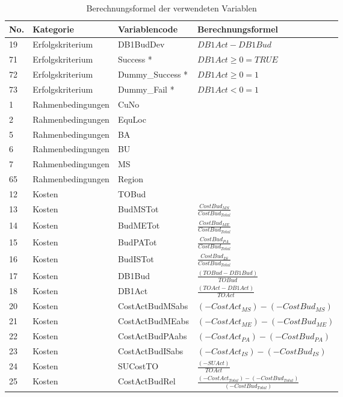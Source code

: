 \begin{longtable}{p{0.5cm}|p{4cm}|p{3.5cm}|p{6cm}}
	\caption{Berechnungsformel der verwendeten Variablen}\\
	\textbf{No.} & \textbf{Kategorie} & {\textbf{Variablencode}} & {\textbf{Berechnungsformel}} \\\hline\endhead
	19    & Erfolgskriterium & DB1BudDev & $DB1Act - DB1Bud$ \\
	71    & Erfolgskriterium & Success *& $DB1Act \geq 0 = TRUE$ \\
	72    & Erfolgskriterium & Dummy\_Success *& $DB1Act \geq 0 = 1$\\
	73    & Erfolgskriterium & Dummy\_Fail *& $DB1Act < 0 = 1$\\\hline
	1     & Rahmenbedingungen & CuNo & \\
	2     & Rahmenbedingungen & EquLoc & \\
	5     & Rahmenbedingungen & BA & \\
	6     & Rahmenbedingungen & BU & \\
	7     & Rahmenbedingungen & MS  &\\
	65    & Rahmenbedingungen & Region & \\\hline
	12    & Kosten & TOBud &\\
	13    & Kosten & BudMSTot & $\frac{Cost Bud_{MS}}{Cost Bud_{Total}}$\\ [3mm]
	14    & Kosten & BudMETot & $\frac{Cost Bud_{ME}}{Cost Bud_{Total}}$ \\[3mm] 
	15    & Kosten & BudPATot & $\frac{Cost Bud_{PA}}{Cost Bud_{Total}}$\\ [3mm]
	16    & Kosten & BudISTot & $\frac{Cost Bud_{IS}}{Cost Bud_{Total}}$\\ [3mm]
	17    & Kosten & DB1Bud & $\frac{(TOBud - DB1Bud)}{TOBud}$ \\ [3mm]
	18    & Kosten & DB1Act & $\frac{(TOAct - DB1Act)}{TOAct}$ \\ [3mm]
	20    & Kosten & CostActBudMSabs & $(-CostAct_{MS})-(-CostBud_{MS})$ \\ 
	21    & Kosten & CostActBudMEabs & $(-CostAct_{ME})-(-CostBud_{ME})$ \\
	22    & Kosten & CostActBudPAabs & $(-CostAct_{PA})-(-CostBud_{PA})$ \\
	23    & Kosten & CostActBudISabs & $(-CostAct_{IS})-(-CostBud_{IS})$ \\
	24    & Kosten & SUCostTO & $\frac{(-SUAct)}{TOAct}$ \\ [3mm]
	25    & Kosten & CostActBudRel & $\frac{(-CostAct_{Total}) - (-CostBud_{Total})}{(-CostBud_{Total})}$ \\ [3mm]

\end{longtable}
